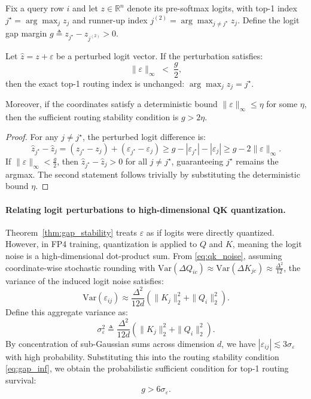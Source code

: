 \begin{theorem}
\label{thm:gap_stability}
Fix a query row $i$ and let $z\in\mathbb{R}^n$ denote its pre-softmax logits, with top-1 index $j^\star=\arg\max_j z_j$ and runner-up index $j^{(2)}=\arg\max_{j\neq j^\star} z_j$. Define the logit gap margin $g \triangleq z_{j^\star} - z_{j^{(2)}} > 0$.

Let $\hat z = z + \varepsilon$ be a perturbed logit vector. If the perturbation satisfies:
\begin{equation}
\|\varepsilon\|_\infty \;<\; \frac{g}{2},
\label{eq:gap_inf}
\end{equation}
then the exact top-1 routing index is unchanged: $\arg\max_j \hat z_j = j^\star$.

Moreover, if the coordinates satisfy a deterministic bound
$\|\varepsilon\|_\infty \le \eta$ for some $\eta$, then the sufficient routing stability condition is $g > 2\eta$.
\end{theorem}

\begin{proof}
For any $j\neq j^\star$, the perturbed logit difference is:
\[
\hat z_{j^\star} - \hat z_j
= (z_{j^\star}-z_j) + (\varepsilon_{j^\star}-\varepsilon_j)
\ge g - |\varepsilon_{j^\star}| - |\varepsilon_j|
\ge g - 2\|\varepsilon\|_\infty.
\]
If $\|\varepsilon\|_\infty < \frac{g}{2}$, then $\hat z_{j^\star} - \hat z_j > 0$ for all $j\neq j^\star$, guaranteeing $j^\star$ remains the argmax. The second statement follows trivially by substituting the deterministic bound $\eta$.
\end{proof}

\paragraph{Relating logit perturbations to high-dimensional QK quantization.}
Theorem~\ref{thm:gap_stability} treats $\varepsilon$ as if logits were directly quantized. However, in FP4 training, quantization is applied to $Q$ and $K$, meaning the logit noise is a high-dimensional dot-product sum. From \eqref{eq:qk_noise}, assuming coordinate-wise stochastic rounding with $\mathrm{Var}(\Delta Q_{ic}) \approx \mathrm{Var}(\Delta K_{jc}) \approx \frac{\Delta^2}{12}$, the variance of the induced logit noise satisfies:
\[
\mathrm{Var}(\varepsilon_{ij})
\approx
\frac{\Delta^2}{12d}
\left(
\|K_j\|_2^2 + \|Q_i\|_2^2
\right).
\]
Define this aggregate variance as:
\[
\sigma_\varepsilon^2 \triangleq \frac{\Delta^2}{12d}\left(\|K_j\|_2^2 + \|Q_i\|_2^2\right).
\]
By concentration of sub-Gaussian sums across dimension $d$, we have $|\varepsilon_{ij}| \lesssim 3\sigma_\varepsilon$ with high probability. Substituting this into the routing stability condition \eqref{eq:gap_inf}, we obtain the probabilistic sufficient condition for top-1 routing survival:
\begin{equation}
g > 6\sigma_\varepsilon.
\label{eq:gap_probabilistic}
\end{equation}

